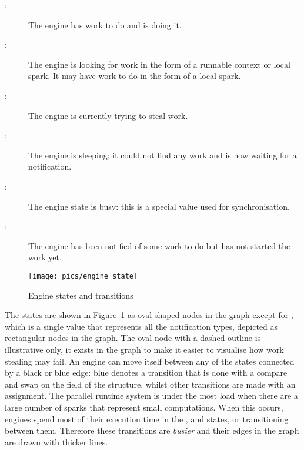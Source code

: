\begin{description}
    \item[:] The engine has work to do and is doing it.

    \item[:] The engine is looking for work in
        the form of a runnable context or local spark.  It may have work to
        do in the form of a local spark.

    \item[:] The engine is currently trying to steal work.

    \item[:] The engine is sleeping; it could not find any
        work and is now waiting for a notification.

    \item[:] The engine state is busy: this is a special value
        used for synchronisation.

    \item[:] The engine has been notified of some work to
        do but has not started the work yet.
\end{description}

\begin{figure}
\begin{center}
\texttt{[image: pics/engine\_state]}
\end{center}
\caption{Engine states and transitions}
\label{fig:engine_states}
\end{figure}

\noindent
The states are shown in Figure~\ref{fig:engine_states} as oval-shaped nodes
in the graph except for ,
which is a single value that represents all the notification types,
depicted as rectangular nodes in the graph.
The oval node with a dashed outline is illustrative only,
it exists in the graph to make it easier to visualise how work stealing may
fail.
An engine can move itself between any of the states connected by a black or
blue edge:
blue denotes a transition that is done with a compare and swap on the
 field of the \enginesleepsync structure,
whilst other transitions are made with an assignment.
The parallel runtime system is under the most load when there are a large
number of sparks that represent small computations.
When this occurs, engines spend most of their execution time in the
,  and 
states, or transitioning between them.
Therefore these transitions are \emph{busier}
and their edges in the graph are drawn with thicker lines.


